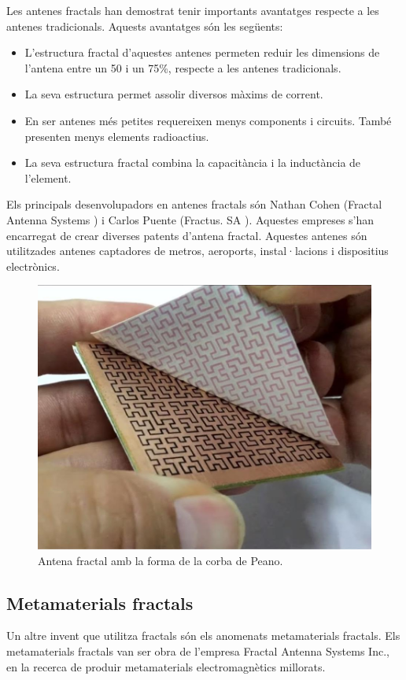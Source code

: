 \documentclass[12pt,a4paper]{report}
\begin{document}
Les antenes fractals han demostrat tenir importants avantatges respecte a les antenes tradicionals. Aquests avantatges són les següents:
\begin{itemize}
\item L'estructura fractal d'aquestes antenes permeten reduir les dimensions de l’antena entre un 50 i un 75\%, respecte a les antenes tradicionals. 
\item La seva estructura permet assolir diversos màxims de corrent.
\item En ser antenes més petites requereixen menys components i circuits. També presenten menys elements radioactius.
\item La seva estructura fractal combina la capacitància i la inductància de l'element.
\end{itemize} 

Els principals desenvolupadors en antenes fractals són Nathan Cohen (Fractal Antenna Systems \cite{Fractenna}) i Carlos Puente (Fractus. SA \cite{Fractus}). Aquestes empreses s'han encarregat de crear diverses patents d'antena fractal. Aquestes antenes són utilitzades antenes captadores de metros, aeroports, instal·lacions i dispositius electrònics.
\begin{figure}[!ht]
\centering
\includegraphics[scale=0.4]{img/img05_02_antena_fractal.jpg}
\caption{Antena fractal amb la forma de la corba de Peano.}
\end{figure}

\subsection{Metamaterials fractals}
Un altre invent que utilitza fractals són els anomenats metamaterials fractals. Els metamaterials fractals van ser obra de l'empresa Fractal Antenna Systems Inc., en la recerca de produir metamaterials electromagnètics millorats.
\end{document}
